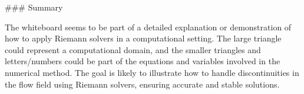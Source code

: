 ### Summary

The whiteboard seems to be part of a detailed explanation or demonstration of how to apply Riemann solvers in a computational setting. The large triangle could represent a computational domain, and the smaller triangles and letters/numbers could be part of the equations and variables involved in the numerical method. The goal is likely to illustrate how to handle discontinuities in the flow field using Riemann solvers, ensuring accurate and stable solutions.